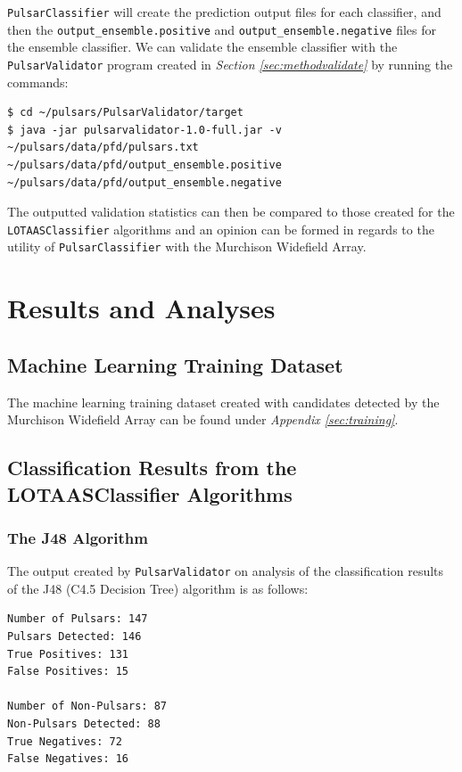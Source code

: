 \documentclass{article}
\begin{document}
\verb|PulsarClassifier| will create the prediction output files for each classifier, and then the \verb|output_ensemble.positive| and \verb|output_ensemble.negative| files for the ensemble classifier. We can validate the ensemble classifier with the \verb|PulsarValidator| program created in \emph{Section \ref{sec:methodvalidate}} by running the commands:

\begin{lstlisting}[numbers=none]
$ cd ~/pulsars/PulsarValidator/target
$ java -jar pulsarvalidator-1.0-full.jar -v ~/pulsars/data/pfd/pulsars.txt ~/pulsars/data/pfd/output_ensemble.positive ~/pulsars/data/pfd/output_ensemble.negative
\end{lstlisting}

The outputted validation statistics can then be compared to those created for the \verb|LOTAASClassifier| algorithms and an opinion can be formed in regards to the utility of \verb|PulsarClassifier| with the Murchison Widefield Array.

\pagebreak
\section{Results and Analyses}
\subsection{Machine Learning Training Dataset}

The machine learning training dataset created with candidates detected by the Murchison Widefield Array can be found under \emph{Appendix \ref{sec:training}}.

\subsection{Classification Results from the LOTAASClassifier Algorithms}

\subsubsection{The J48 Algorithm}

The output created by \verb|PulsarValidator| on analysis of the classification results of the J48 (C4.5 Decision Tree) algorithm is as follows:

\begin{lstlisting}[numbers=none]
Number of Pulsars: 147
Pulsars Detected: 146
True Positives: 131
False Positives: 15

Number of Non-Pulsars: 87
Non-Pulsars Detected: 88
True Negatives: 72
False Negatives: 16
\end{lstlisting}
\end{document}
